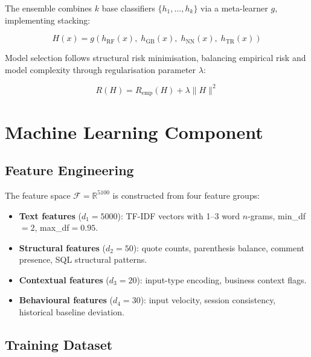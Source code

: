 \documentclass[10pt, twocolumn]{article}
\begin{document}
The ensemble combines $k$ base classifiers $\{h_1, \ldots, h_k\}$ via a 
meta-learner $g$, implementing stacking:

\begin{equation}
H(x) = g\!\left(h_{\text{RF}}(x),\; h_{\text{GB}}(x),\; h_{\text{NN}}(x),\; h_{\text{TR}}(x)\right)
\end{equation}

Model selection follows structural risk minimisation, balancing empirical 
risk and model complexity through regularisation parameter $\lambda$:

\begin{equation}
R(H) = R_{\text{emp}}(H) + \lambda \|H\|^2
\end{equation}

\section{Machine Learning Component}
\label{sec:ml}

\subsection{Feature Engineering}

The feature space $\mathcal{F} = \mathbb{R}^{5100}$ is constructed from 
four feature groups:

\begin{itemize}[leftmargin=*, itemsep=1pt, topsep=2pt]
  \item \textbf{Text features} ($d_1 = 5000$): TF-IDF vectors with 
        1--3 word $n$-grams, min\_df$=2$, max\_df$=0.95$.
  \item \textbf{Structural features} ($d_2 = 50$): quote counts, 
        parenthesis balance, comment presence, SQL structural patterns.
  \item \textbf{Contextual features} ($d_3 = 20$): input-type encoding, 
        business context flags.
  \item \textbf{Behavioural features} ($d_4 = 30$): input velocity, 
        session consistency, historical baseline deviation.
\end{itemize}

\subsection{Training Dataset}
\end{document}
